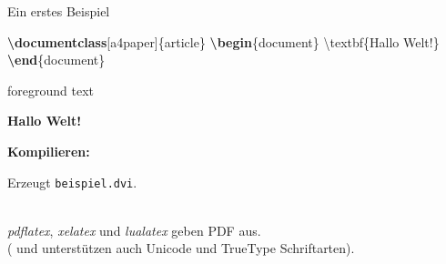 \documentclass[aspectratio=169]{beamer}
\newenvironment{Shaded}{\begin{snugshade}}{\end{snugshade}}
\newcommand{\BuiltInTok}[1]{\textcolor[rgb]{0.25,0.67,0.19}{\textbf{#1}}}
\newcommand{\ExtensionTok}[1]{\textcolor[rgb]{0.25,0.67,0.19}{#1}}
\newcommand{\FunctionTok}[1]{\textcolor[rgb]{0.34,0.51,0.35}{#1}}
\newcommand{\KeywordTok}[1]{\textcolor[rgb]{0.25,0.67,0.19}{\textbf{#1}}}
\newcommand{\NormalTok}[1]{\textcolor[rgb]{0.19,0.19,0.19}{#1}}
\newenvironment{Shaded}{}{}
\newcommand\citestyle[1]{\textcolor{foreground-secondary}{\textsuperscript{#1}}}
\let\oldautocite\autocite
\renewcommand{\autocite}[1]{\citestyle{\oldautocite{#1}}}
\begin{document}
    \begin{frame}[fragile]{Ein erstes Beispiel}
    \protect\hypertarget{ein-erstes-beispiel}{}
    \begin{minipage}{0.66\textwidth}

\begin{Shaded}
\begin{Highlighting}[]
\BuiltInTok{\textbackslash{}documentclass}\NormalTok{[a4paper]\{}\ExtensionTok{article}\NormalTok{\}}
\KeywordTok{\textbackslash{}begin}\NormalTok{\{}\ExtensionTok{document}\NormalTok{\}}
    \FunctionTok{\textbackslash{}textbf}\NormalTok{\{Hallo Welt!\}}
\KeywordTok{\textbackslash{}end}\NormalTok{\{}\ExtensionTok{document}\NormalTok{\}}
\end{Highlighting}
\end{Shaded}

    \end{minipage}\begin{minipage}{0.33\textwidth}

    \bgroup 
        \begin{OutputBox}
        \begin{beamercolorbox}{foreground text}
            \selectfont%

        \textbf{Hallo Welt!}

            \end{beamercolorbox}
        \end{OutputBox}
    \egroup

    \end{minipage}

    \vspace{0.5\baselineskip}

    \textbf{Kompilieren:}

\begin{Shaded}
\end{Shaded}

    Erzeugt \texttt{beispiel.dvi}.\\
    \strut \\
    \emph{pdflatex}\autocite{ctan-pdftex},
    \emph{xelatex}\autocite{ctan-xetex} und
    \emph{lualatex}\autocite{ctan-luatex} geben PDF aus.\\
    ( und  unterstützen auch Unicode und
    TrueType Schriftarten).
    \end{frame}
\end{document}
